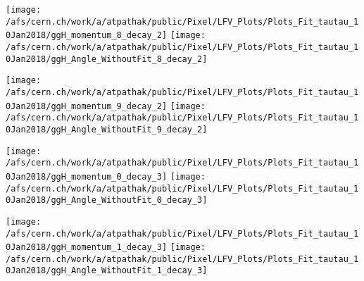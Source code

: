 \documentclass{beamer}
\begin{document}
\begin{frame}
\begin{normalsize}
\begin{center}
\texttt{[image: /afs/cern.ch/work/a/atpathak/public/Pixel/LFV\_Plots/Plots\_Fit\_tautau\_10Jan2018/ggH\_momentum\_8\_decay\_2]}
\texttt{[image: /afs/cern.ch/work/a/atpathak/public/Pixel/LFV\_Plots/Plots\_Fit\_tautau\_10Jan2018/ggH\_Angle\_WithoutFit\_8\_decay\_2]} 
\end{center}
\end{normalsize}
\end {frame}
\begin{frame}
\begin{normalsize}
\begin{center}
\texttt{[image: /afs/cern.ch/work/a/atpathak/public/Pixel/LFV\_Plots/Plots\_Fit\_tautau\_10Jan2018/ggH\_momentum\_9\_decay\_2]}
\texttt{[image: /afs/cern.ch/work/a/atpathak/public/Pixel/LFV\_Plots/Plots\_Fit\_tautau\_10Jan2018/ggH\_Angle\_WithoutFit\_9\_decay\_2]} 
\end{center}
\end{normalsize}
\end {frame}
\begin{frame}
\begin{normalsize}
\begin{center}
\texttt{[image: /afs/cern.ch/work/a/atpathak/public/Pixel/LFV\_Plots/Plots\_Fit\_tautau\_10Jan2018/ggH\_momentum\_0\_decay\_3]}
\texttt{[image: /afs/cern.ch/work/a/atpathak/public/Pixel/LFV\_Plots/Plots\_Fit\_tautau\_10Jan2018/ggH\_Angle\_WithoutFit\_0\_decay\_3]} 
\end{center}
\end{normalsize}
\end {frame}
\begin{frame}
\begin{normalsize}
\begin{center}
\texttt{[image: /afs/cern.ch/work/a/atpathak/public/Pixel/LFV\_Plots/Plots\_Fit\_tautau\_10Jan2018/ggH\_momentum\_1\_decay\_3]}
\texttt{[image: /afs/cern.ch/work/a/atpathak/public/Pixel/LFV\_Plots/Plots\_Fit\_tautau\_10Jan2018/ggH\_Angle\_WithoutFit\_1\_decay\_3]} 
\end{center}
\end{normalsize}
\end {frame}
\end{document}
